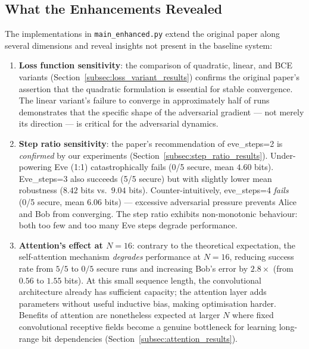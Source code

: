 \documentclass[12pt, a4paper]{article}
\newcommand{\code}[1]{\texttt{\color{CodeRed}#1}}
\begin{document}
\subsection{What the Enhancements Revealed}
\label{subsec:enhancements_revealed}

The implementations in \code{main\_enhanced.py} extend the original
paper along several dimensions and reveal insights not present in the
baseline system:

\begin{enumerate}[leftmargin=2em, itemsep=6pt]

  \item \textbf{Loss function sensitivity}: the comparison of quadratic,
        linear, and BCE variants (Section~\ref{subsec:loss_variant_results}) confirms the original
        paper's assertion that the quadratic formulation is essential
        for stable convergence. The linear variant's failure to converge
        in approximately half of runs demonstrates that the specific
        shape of the adversarial gradient --- not merely its direction
        --- is critical for the adversarial dynamics.

  \item \textbf{Step ratio sensitivity}: the paper's recommendation of
        eve\_steps=2 is \emph{confirmed} by our experiments (Section~\ref{subsec:step_ratio_results}).
        Under-powering Eve (1:1) catastrophically fails (0/5 secure, mean
        $4.60$ bits). Eve\_steps=3 also succeeds (5/5 secure) but with
        slightly lower mean robustness ($8.42$ bits vs.\ $9.04$ bits).
        Counter-intuitively, eve\_steps=4 \emph{fails} (0/5 secure, mean
        $6.06$ bits) --- excessive adversarial pressure prevents Alice
        and Bob from converging. The step ratio exhibits non-monotonic
        behaviour: both too few and too many Eve steps degrade performance.

  \item \textbf{Attention's effect at $N=16$}: contrary to the theoretical
        expectation, the self-attention mechanism \emph{degrades} performance at
        $N=16$, reducing success rate from $5/5$ to $0/5$ secure runs and
        increasing Bob's error by $2.8\times$ (from $0.56$ to $1.55$ bits).
        At this small sequence length, the convolutional architecture already
        has sufficient capacity; the attention layer adds parameters without
        useful inductive bias, making optimisation harder. Benefits of attention
        are nonetheless expected at larger $N$ where fixed convolutional
        receptive fields become a genuine bottleneck for learning long-range
        bit dependencies (Section~\ref{subsec:attention_results}).


\end{enumerate}
\end{document}
